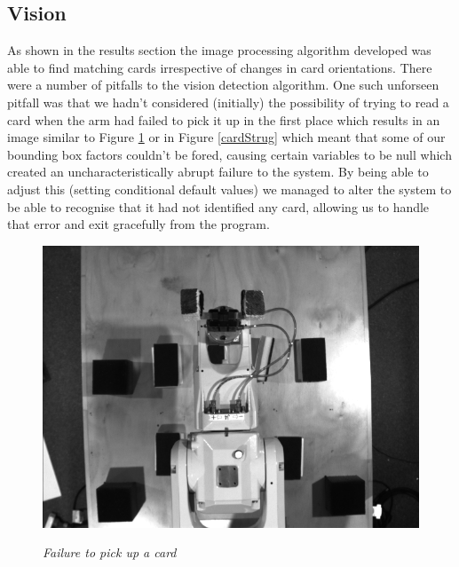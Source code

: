 \subsection{Vision}
As shown in the results section the image processing algorithm developed was able to find matching cards irrespective of changes in card orientations. There were a number of pitfalls to the vision detection algorithm.
One such unforseen pitfall was that we hadn't considered (initially) the possibility of trying to read a card when the arm had failed to pick it up in the first place which results in an image similar to Figure \ref{nocard} or in Figure \ref{cardStrug} which meant that some of our bounding box factors couldn't be fored, causing certain variables to be null which created an uncharacteristically abrupt failure to the system. By being able to adjust this (setting conditional default values) we managed to alter the system to be able to recognise that it had not identified any card, allowing us to handle that error and exit gracefully from the program.

\begin{figure}[position = here]
	\begin{centering}
		\includegraphics[scale=0.3]{./test_images_gray/test_image74.png}\\
		\caption[]{\textit{Failure to pick up a card\label{nocard}}}
	\end{centering}
\end{figure}

